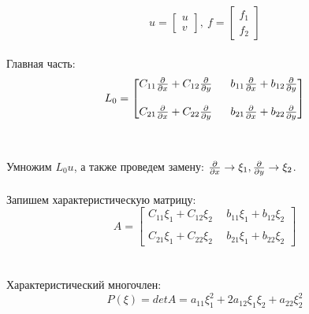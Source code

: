 \documentclass[../main.tex]{subfiles}
\begin{document}
$$u = \begin{bmatrix}
u \\ v
\end{bmatrix}, \  f = \begin{bmatrix}
f_1 \\ f_2
\end{bmatrix}$$ \\
Главная часть: \\ 
$$
L_0 = \begin{bmatrix}
C_{11}\frac{\partial }{\partial x} + C_{12}\frac{\partial }{\partial y} \ & \ b_{11}\frac{\partial }{\partial x} + b_{12}\frac{\partial }{\partial y} \\ \\ 
C_{21}\frac{\partial }{\partial x} + C_{22}\frac{\partial }{\partial y} \ & \ b_{21}\frac{\partial }{\partial x} + b_{22}\frac{\partial }{\partial y} 
\end{bmatrix}
$$ \\ \\
Умножим $L_0u$, а также проведем замену: $\frac{\partial }{\partial x} \rightarrow \xi_1, \frac{\partial }{\partial y} \rightarrow \xi_2$. \\
\\ Запишем характеристическую матрицу:
$$
A = \begin{bmatrix}
C_{11}\xi_1 + C_{12}\xi_2 \ & \ b_{11}\xi_1 + b_{12}\xi_2 \\ \\ 
C_{21}\xi_1 + C_{22}\xi_2 \ & \ b_{21}\xi_1 + b_{22}\xi_2 
\end{bmatrix}
$$ \\ \\
Характеристический многочлен:\\
$$P(\xi) = detA = a_{11}\xi_1^2 + 2a_{12}\xi_1\xi_2+a_{22}\xi_2^2$$
\end{document}
